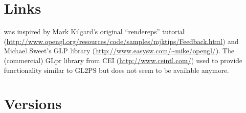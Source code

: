 \section{Links}
\label{sec:links}

 was inspired by Mark Kilgard's original ``rendereps'' tutorial
(\url{http://www.opengl.org/resources/code/samples/mjktips/Feedback.html})
and Michael Sweet's GLP library (\url{http://www.easysw.com/~mike/opengl/}).
The (commercial) GLpr library from CEI (\url{http://www.ceintl.com/}) used
to provide functionality similar to GL2PS but does not seem to be available
anymore.


\section{Versions}

